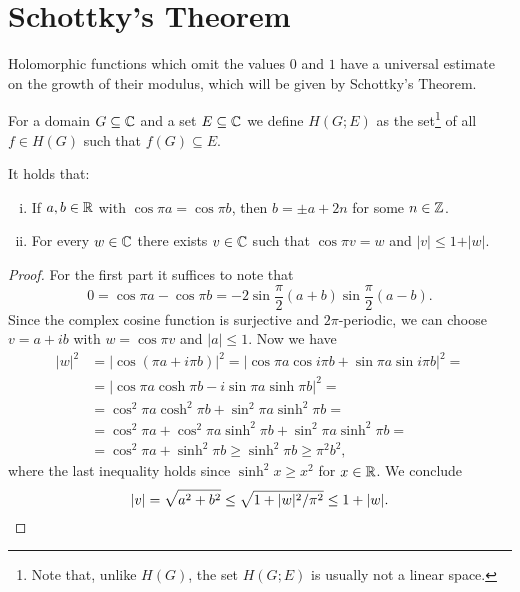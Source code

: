 \section{Schottky's Theorem}
\label{sec:schottkys-theorem}

Holomorphic functions which omit the values $0$ and $1$ have a universal estimate on the growth of their modulus, which will be given by Schottky's Theorem.

For a domain $G \subseteq \mathbb{C}$ and a set $E \subseteq \mathbb{C}$ we define $H(G; E)$ as the set\footnote{Note that, unlike $H(G)$, the set $H(G; E)$ is usually not a linear space.} of all $f \in H(G)$ such that $f(G) \subseteq E$.

\begin{lemma} \label{lem:schottky-1}
    It holds that:
    \begin{enumerate}[i.]
        \item If $a, b \in \mathbb{R}$ with $\cos \pi a = \cos \pi b$, then $b = \pm a + 2n$ for some $n \in \mathbb{Z}$.
        \item For every $w \in \mathbb{C}$ there exists $v \in \mathbb{C}$ such that $\cos \pi v = w$ and $\vert v \vert \leq 1 + \vert w \vert$.
    \end{enumerate}
\end{lemma}

\begin{proof}
    For the first part it suffices to note that
    $$ 0 = \cos \pi a - \cos \pi b = \textstyle -2 \sin \frac{\pi}{2} ( a + b ) \sin \frac{\pi}{2} ( a - b ). $$
    Since the complex cosine function is surjective and $2 \pi$-periodic, we can choose $v = a + i b$ with $w = \cos \pi v$ and $\vert a \vert \leq 1$. Now we have
    \begin{align*}
        \vert w \vert^2 &= \vert \cos (\pi a + i \pi b) \vert^2 = \vert \cos \pi a \cos i \pi b + \sin \pi a \sin i \pi b \vert^2 = \\
        &= \vert \cos \pi a \cosh \pi b - i \sin \pi a \sinh \pi b \vert^2 = \\
        &= \cos^2 \pi a \cosh^2 \pi b + \sin^2 \pi a \sinh^2 \pi b = \\
        &= \cos^2 \pi a + \cos^2 \pi a \sinh^2 \pi b + \sin^2 \pi a \sinh^2 \pi b = \\
        &= \cos^2 \pi a + \sinh^2 \pi b \geq \sinh^2 \pi b \geq \pi^2 b^2,
    \end{align*}
    where the last inequality holds since $\sinh^2 x \geq x^2$ for $x \in \mathbb{R}$. We conclude
    \begin{equation*}
        \vert v \vert = \sqrt{a^2 + b^2} \leq \sqrt{1 + \vert w \vert^2 / \pi^2} \leq 1 + \vert w \vert. \qedhere
    \end{equation*}
\end{proof}

